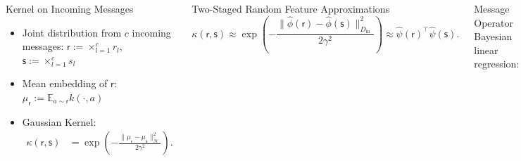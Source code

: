 \documentclass[english]{beamer}
\begin{document}
\begin{frame}
\begin{columns}[t]
\begin{block}{Kernel on Incoming Messages}
\begin{itemize}
    \item Joint distribution from $c$ incoming messages: 
        $\mathsf{r}:=\times_{l=1}^c r_{l}$, \hspace{5mm}
        $\mathsf{s}:=\times_{l=1}^c s_{l}$     
    
    \item Mean embedding of $\mathsf{r}$:
        $\mu_{\mathsf{r}}:=\mathbb{E}_{a \sim \mathsf{r}}k(\cdot,a)$ 

    \item Gaussian Kernel: 
        \begin{align*}
            \kappa(\mathsf{r}, \mathsf{s}) &= 
            \exp\left(-\frac{\|\mu_{\mathsf{r}}-\mu_{\mathsf{s}}\|_{\mathcal{H}}^{2}}{2\gamma^{2}}\right). 
        \end{align*}

\end{itemize}
%
%
\end{block}

Two-Staged Random Feature Approximations
\begin{equation*}
    \kappa(\mathsf{r},
    \mathsf{s})\approx\exp\left(-\frac{
        \|\hat{\phi}(\mathsf{r})-\hat{\phi}(\mathsf{s})\|_{D_\mathrm{in}}^{2}}{2\gamma^{2}}\right)
        \approx
        \hat{\psi}(\mathsf{r})^\top \hat{\psi}(\mathsf{s}).
    \end{equation*}

\begin{block}{Message Operator }
Bayesian linear regression:


\end{block}
\end{columns}
\end{frame}
\end{document}
